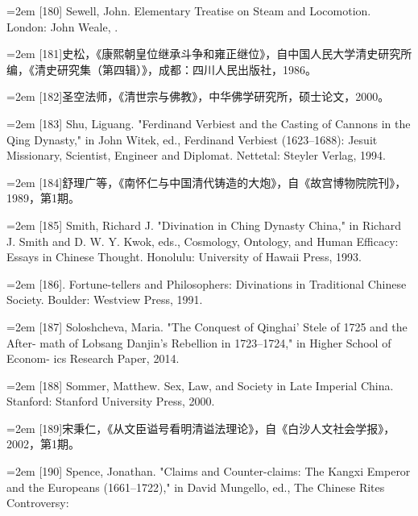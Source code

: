 \noindent\hangindent=2em
[180] Sewell, John. Elementary Treatise on Steam and Locomotion. London: John Weale,%
.%
\par
\noindent\hangindent=2em
[181]史松，《康熙朝皇位继承斗争和雍正继位》，自中国人民大学清史研究所%
编，《清史研究集（第四辑）》，成都：四川人民出版社，1986。%
\par
\noindent\hangindent=2em
[182]圣空法师，《清世宗与佛教》，中华佛学研究所，硕士论文，2000。%
\par
\noindent\hangindent=2em
[183] Shu, Liguang. "Ferdinand Verbiest and the Casting of Cannons in the Qing%
\space%
Dynasty," in John Witek, ed., Ferdinand Verbiest (1623–1688): Jesuit Missionary,%
\space%
Scientist, Engineer and Diplomat. Nettetal: Steyler Verlag, 1994.%
\par
\noindent\hangindent=2em
[184]舒理广等，《南怀仁与中国清代铸造的大炮》，自《故宫博物院院刊》，%
1989，第1期。%
\par
\noindent\hangindent=2em
[185] Smith, Richard J. "Divination in Ching Dynasty China," in Richard J. Smith%
\space%
and D. W. Y. Kwok, eds., Cosmology, Ontology, and Human Efficacy: Essays in%
\space%
Chinese Thought. Honolulu: University of Hawaii Press, 1993.%
\par
\noindent\hangindent=2em
[186]. Fortune-tellers and Philosophers: Divinations in Traditional Chinese Society.%
\space%
Boulder: Westview Press, 1991.%
\par
\noindent\hangindent=2em
[187] Soloshcheva, Maria. "The Conquest of Qinghai' Stele of 1725 and the After-%
math of Lobsang Danjin's Rebellion in 1723–1724," in Higher School of Econom-%
ics Research Paper, 2014.%
\par
\noindent\hangindent=2em
[188] Sommer, Matthew. Sex, Law, and Society in Late Imperial China. Stanford:%
\space%
Stanford University Press, 2000.%
\par
\noindent\hangindent=2em
[189]宋秉仁，《从文臣谥号看明清谥法理论》，自《白沙人文社会学报》，%
2002，第1期。%
\par
\noindent\hangindent=2em
[190] Spence, Jonathan. "Claims and Counter-claims: The Kangxi Emperor and the%
\space%
Europeans (1661–1722)," in David Mungello, ed., The Chinese Rites Controversy:%
